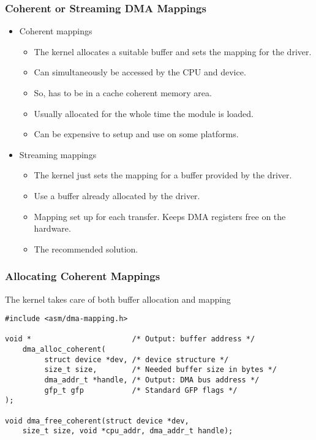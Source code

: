 \begin{frame}
  \frametitle{Coherent or Streaming DMA Mappings}
  \begin{itemize}
  \item Coherent mappings
    \begin{itemize}
    \item The kernel allocates a suitable buffer and sets the mapping
      for the driver.
    \item Can simultaneously be accessed by the CPU and device.
    \item So, has to be in a cache coherent memory area.
    \item Usually allocated for the whole time the module is loaded.
    \item Can be expensive to setup and use on some platforms.
    \end{itemize}
  \item Streaming mappings
    \begin{itemize}
    \item The kernel just sets the mapping for a buffer provided by
      the driver.
    \item Use a buffer already allocated by the driver.
    \item Mapping set up for each transfer. Keeps DMA registers free
      on the hardware.
    \item The recommended solution.
    \end{itemize}
  \end{itemize}
\end{frame}

\begin{frame}[fragile]
  \frametitle{Allocating Coherent Mappings}
  The kernel takes care of both buffer allocation and mapping
\begin{verbatim}
#include <asm/dma-mapping.h>

void *                       /* Output: buffer address */
    dma_alloc_coherent(
         struct device *dev, /* device structure */
         size_t size,        /* Needed buffer size in bytes */
         dma_addr_t *handle, /* Output: DMA bus address */
         gfp_t gfp           /* Standard GFP flags */
);

void dma_free_coherent(struct device *dev,
    size_t size, void *cpu_addr, dma_addr_t handle);
\end{verbatim}
\end{frame}

